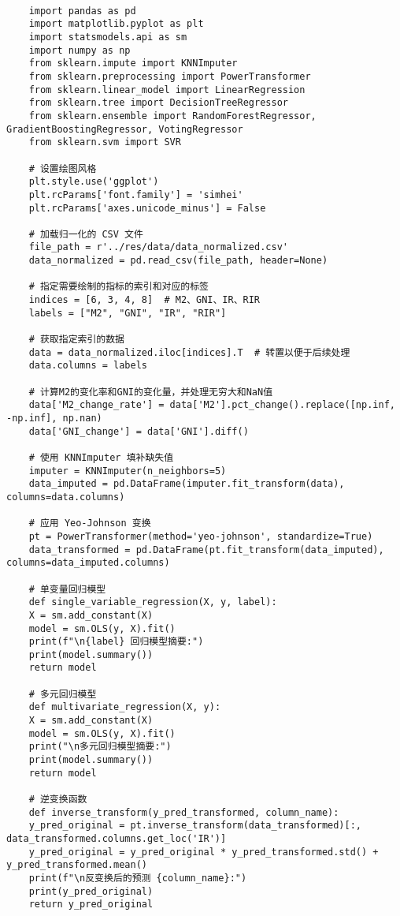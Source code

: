 \begin{lstlisting}[caption={问题二处理代码}]
	
	import pandas as pd
	import matplotlib.pyplot as plt
	import statsmodels.api as sm
	import numpy as np
	from sklearn.impute import KNNImputer
	from sklearn.preprocessing import PowerTransformer
	from sklearn.linear_model import LinearRegression
	from sklearn.tree import DecisionTreeRegressor
	from sklearn.ensemble import RandomForestRegressor, GradientBoostingRegressor, VotingRegressor
	from sklearn.svm import SVR
	
	# 设置绘图风格
	plt.style.use('ggplot')
	plt.rcParams['font.family'] = 'simhei'
	plt.rcParams['axes.unicode_minus'] = False
	
	# 加载归一化的 CSV 文件
	file_path = r'../res/data/data_normalized.csv'
	data_normalized = pd.read_csv(file_path, header=None)
	
	# 指定需要绘制的指标的索引和对应的标签
	indices = [6, 3, 4, 8]  # M2、GNI、IR、RIR
	labels = ["M2", "GNI", "IR", "RIR"]
	
	# 获取指定索引的数据
	data = data_normalized.iloc[indices].T  # 转置以便于后续处理
	data.columns = labels
	
	# 计算M2的变化率和GNI的变化量，并处理无穷大和NaN值
	data['M2_change_rate'] = data['M2'].pct_change().replace([np.inf, -np.inf], np.nan)
	data['GNI_change'] = data['GNI'].diff()
	
	# 使用 KNNImputer 填补缺失值
	imputer = KNNImputer(n_neighbors=5)
	data_imputed = pd.DataFrame(imputer.fit_transform(data), columns=data.columns)
	
	# 应用 Yeo-Johnson 变换
	pt = PowerTransformer(method='yeo-johnson', standardize=True)
	data_transformed = pd.DataFrame(pt.fit_transform(data_imputed), columns=data_imputed.columns)
	
	# 单变量回归模型
	def single_variable_regression(X, y, label):
	X = sm.add_constant(X)
	model = sm.OLS(y, X).fit()
	print(f"\n{label} 回归模型摘要:")
	print(model.summary())
	return model
	
	# 多元回归模型
	def multivariate_regression(X, y):
	X = sm.add_constant(X)
	model = sm.OLS(y, X).fit()
	print("\n多元回归模型摘要:")
	print(model.summary())
	return model
	
	# 逆变换函数
	def inverse_transform(y_pred_transformed, column_name):
	y_pred_original = pt.inverse_transform(data_transformed)[:, data_transformed.columns.get_loc('IR')]
	y_pred_original = y_pred_original * y_pred_transformed.std() + y_pred_transformed.mean()
	print(f"\n反变换后的预测 {column_name}:")
	print(y_pred_original)
	return y_pred_original
	

\end{lstlisting}
